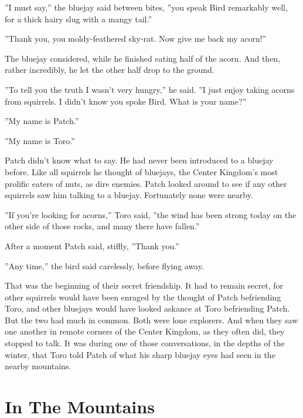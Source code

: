 \documentclass[12pt]{book}
\begin{document}
''I must say,'' the bluejay said between bites, ''you speak Bird remarkably well, for a thick hairy slug with a mangy tail.''\par
''Thank you, you moldy-feathered sky-rat. Now give me back my acorn!''\par
The bluejay considered, while he finished eating half of the acorn. And then, rather incredibly, he let the other half drop to the ground.\par
''To tell you the truth I wasn't very hungry,'' he said. ''I just enjoy taking acorns from squirrels. I didn't know you spoke Bird. What is your name?''\par
''My name is Patch.''\par
''My name is Toro.''\par
Patch didn't know what to say. He had never been introduced to a bluejay before. Like all squirrels he thought of bluejays, the Center Kingdom's most prolific eaters of nuts, as dire enemies. Patch looked around to see if any other squirrels saw him talking to a bluejay. Fortunately none were nearby.\par
''If you're looking for acorns,'' Toro said, ''the wind has been strong today on the other side of those rocks, and many there have fallen.''\par
After a moment Patch said, stiffly, ''Thank you.''\par
''Any time,'' the bird said carelessly, before flying away.\par
That was the beginning of their secret friendship. It had to remain secret, for other squirrels would have been enraged by the thought of Patch befriending Toro, and other bluejays would have looked askance at Toro befriending Patch. But the two had much in common. Both were lone explorers. And when they saw one another in remote corners of the Center Kingdom, as they often did, they stopped to talk. It was during one of those conversations, in the depths of the winter, that Toro told Patch of what his sharp bluejay eyes had seen in the nearby mountains.\par

\section{In The Mountains}
\end{document}
